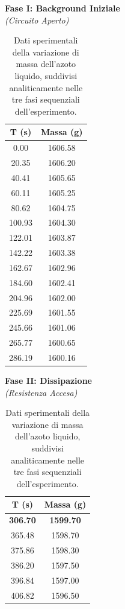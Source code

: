 \documentclass[a4paper,12pt]{article}
\begin{document}
\begin{table}[htbp]
\centering
\caption{Dati sperimentali della variazione di massa dell'azoto liquido, suddivisi analiticamente nelle tre fasi sequenziali dell'esperimento.}
\label{tab:dati_fasi_confronto}
\vspace{0.3cm}
\footnotesize 

\begin{minipage}[t]{0.31\textwidth}
\centering
\textbf{Fase I: Background Iniziale} \\
\textit{(Circuito Aperto)} \\
\vspace{0.2cm}
\begin{tabular}{cc}
\toprule
\textbf{T (s)} & \textbf{Massa (g)} \\
\midrule
0.00 & 1606.58 \\
20.35 & 1606.20 \\
40.41 & 1605.65 \\
60.11 & 1605.25 \\
80.62 & 1604.75 \\
100.93 & 1604.30 \\
122.01 & 1603.87 \\
142.22 & 1603.38 \\
162.67 & 1602.96 \\
184.60 & 1602.41 \\
204.96 & 1602.00 \\
225.69 & 1601.55 \\
245.66 & 1601.06 \\
265.77 & 1600.65 \\
286.19 & 1600.16 \\
\bottomrule
\end{tabular}
\end{minipage}
\hfill
\begin{minipage}[t]{0.33\textwidth}
\centering
\textbf{Fase II: Dissipazione} \\
\textit{(Resistenza Accesa)} \\
\vspace{0.2cm}
\begin{tabular}{cc}
\toprule
\textbf{T (s)} & \textbf{Massa (g)} \\
\midrule
\textbf{306.70} & \textbf{1599.70} \\
365.48 & 1598.70 \\
375.86 & 1598.30 \\
386.20 & 1597.50 \\
396.84 & 1597.00 \\
406.82 & 1596.50 \\

\end{tabular}
\end{minipage}
\end{table}
\end{document}
